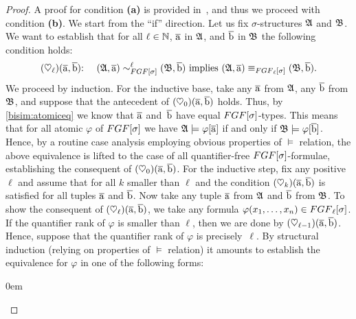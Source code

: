 
\begin{proof}
  A proof for condition \textbf{(a)} is provided in~\cite[Lemma 3]{BednarczykJ22}, and thus we proceed with condition \textbf{(b)}.
  We start from the ``if'' direction. 
  Let us fix $\sigma$-structures ${\mathfrak{A}}$ and ${\mathfrak{B}}$.
  We want to establish that for all $\ell \in {\mathbb{N}}$, $\overline{\mathrm{a}}$ in ${\mathfrak{A}}$, and $\overline{\mathrm{b}}$ in ${\mathfrak{B}}$ the following condition holds:
  \[
    (\heartsuit_\ell)(\elemtuplea, \elemtupleb){:} \ \ \ \  (\str{A}, \elemtuplea) \bisimto_{\FGF[\sigma]}^{\ell} (\str{B}, \elemtupleb) \ \text{implies} \ (\str{A}, \elemtuplea) \equiv_{\FGF_\ell[\sigma]} (\str{B}, \elemtupleb).
  \]
  We proceed by induction. 
  For the inductive base, take any $\overline{\mathrm{a}}$ from ${\mathfrak{A}}$, any $\overline{\mathrm{b}}$ from ${\mathfrak{B}}$, and suppose that the antecedent of $(\heartsuit_0)(\overline{\mathrm{a}},\overline{\mathrm{b}})$ holds.
  Thus, by \ref{bisim:atomiceq} we know that $\overline{\mathrm{a}}$ and~$\overline{\mathrm{b}}$ have equal $\FGF[\sigma]$-types.
  This means that for all atomic $\varphi$ of $\FGF[\sigma]$ we have ${\mathfrak{A}} \models \varphi[\overline{\mathrm{a}}]$ if and only if ${\mathfrak{B}} \models \varphi[\overline{\mathrm{b}}]$.
  Hence, by a routine case analysis employing obvious properties of $\models$ relation, the above equivalence is lifted to the case of all quantifier-free $\FGF[\sigma]$-formulae, establishing the consequent of $(\heartsuit_0)(\overline{\mathrm{a}},\overline{\mathrm{b}})$.
  For the inductive step, fix any positive $\ell$ and assume that for all $k$ smaller than $\ell$ and the condition $(\heartsuit_k)(\overline{\mathrm{a}},\overline{\mathrm{b}})$ is satisfied for all tuples $\overline{\mathrm{a}}$ and $\overline{\mathrm{b}}$.
  Now take any tuple $\overline{\mathrm{a}}$ from ${\mathfrak{A}}$ and $\overline{\mathrm{b}}$ from ${\mathfrak{B}}$.
  To show the consequent of $(\heartsuit_\ell)(\overline{\mathrm{a}},\overline{\mathrm{b}})$, we take any formula $\varphi(x_1, \ldots, x_n) \in \FGF_\ell[\sigma]$.
  If the quantifier rank of $\varphi$ is smaller than $\ell$, then we are done by $(\heartsuit_{\ell{-}1})(\overline{\mathrm{a}},\overline{\mathrm{b}})$.
  Hence, suppose that the quantifier rank of $\varphi$ is precisely~$\ell$.
  By structural induction (relying on properties of $\models$ relation) it amounts to establish the equivalence for $\varphi$ in one of the following forms: 
  \begin{itemize}\itemsep0em


\end{itemize}
\end{proof}
